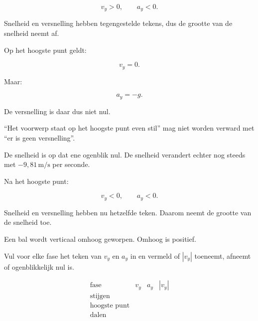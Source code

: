 \documentclass{ximera}
\begin{document}
\[
v_y>0,
\qquad
a_y<0.
\]

Snelheid en versnelling hebben tegengestelde tekens, dus de grootte
van de snelheid neemt af.



Op het hoogste punt geldt:

\[
\boxed{v_y=0.}
\]

Maar:

\[
\boxed{a_y=-g.}
\]

De versnelling is daar dus niet nul.

\begin{opmerking}

``Het voorwerp staat op het hoogste punt even stil'' mag niet worden
verward met ``er is geen versnelling''.

De snelheid is op dat ene ogenblik nul. De snelheid verandert echter
nog steeds met $-9,81\,\mathrm{m/s}$ per seconde.

\end{opmerking}



Na het hoogste punt:

\[
v_y<0,
\qquad
a_y<0.
\]

Snelheid en versnelling hebben nu hetzelfde teken. Daarom neemt de
grootte van de snelheid toe.


\begin{oefening}{\oefB\ESS}

Een bal wordt verticaal omhoog geworpen. Omhoog is positief.

Vul voor elke fase het teken van $v_y$ en $a_y$ in en vermeld of
$|v_y|$ toeneemt, afneemt of ogenblikkelijk nul is.

\[
\begin{array}{c|c|c|c}
\text{fase} & v_y & a_y & |v_y|\\ \hline
\text{stijgen} & & &\\
\text{hoogste punt} & & &\\
\text{dalen} & & &
\end{array}
\]

\end{oefening}
\end{document}
